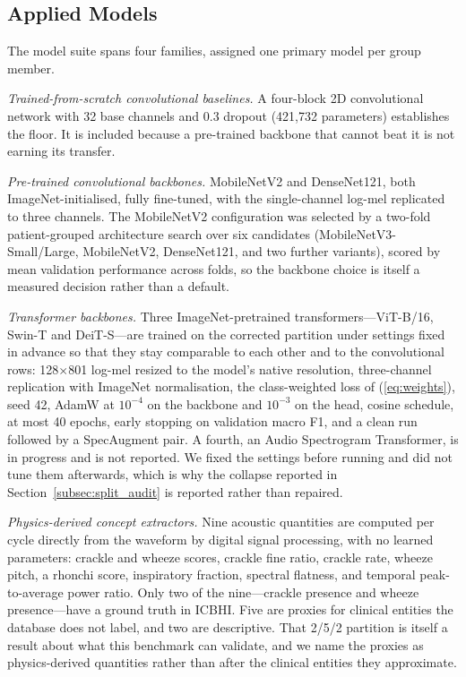 \documentclass[journal,onecolumn]{IEEEtran}
\begin{document}
\subsection{Applied Models}
\label{subsec:models}

The model suite spans four families, assigned one primary model per group member.

\emph{Trained-from-scratch convolutional baselines.} A four-block 2D convolutional
network with 32 base channels and 0.3 dropout (421{,}732 parameters) establishes the
floor. It is included because a pre-trained backbone that cannot beat it is not
earning its transfer.

\emph{Pre-trained convolutional backbones.} MobileNetV2 and DenseNet121, both
ImageNet-initialised, fully fine-tuned, with the single-channel log-mel replicated to
three channels. The MobileNetV2 configuration was selected by a two-fold
patient-grouped architecture search over six candidates (MobileNetV3-Small/Large,
MobileNetV2, DenseNet121, and two further variants), scored by mean validation
performance across folds, so the backbone choice is itself a measured decision rather
than a default.

\emph{Transformer backbones.} Three ImageNet-pretrained transformers---ViT-B/16,
Swin-T and DeiT-S---are trained on the corrected partition under settings fixed in
advance so that they stay comparable to each other and to the convolutional rows:
128$\times$801 log-mel resized to the model's native resolution, three-channel
replication with ImageNet normalisation, the class-weighted loss of (\ref{eq:weights}),
seed 42, AdamW at $10^{-4}$ on the backbone and $10^{-3}$ on the head, cosine schedule,
at most 40 epochs, early stopping on validation macro F1, and a clean run followed by a
SpecAugment pair. A fourth, an Audio Spectrogram Transformer, is in progress and is not
reported. We fixed the settings before running and did not tune them afterwards, which
is why the collapse reported in Section~\ref{subsec:split_audit} is reported rather than
repaired.

\emph{Physics-derived concept extractors.} Nine acoustic quantities are computed per
cycle directly from the waveform by digital signal processing, with no learned
parameters: crackle and wheeze scores, crackle fine ratio, crackle rate, wheeze
pitch, a rhonchi score, inspiratory fraction, spectral flatness, and temporal
peak-to-average power ratio. Only two of the nine---crackle presence and wheeze
presence---have a ground truth in ICBHI. Five are proxies for clinical entities the
database does not label, and two are descriptive. That 2/5/2 partition is itself a
result about what this benchmark can validate, and we name the proxies as
physics-derived quantities rather than after the clinical entities they approximate.
\end{document}
